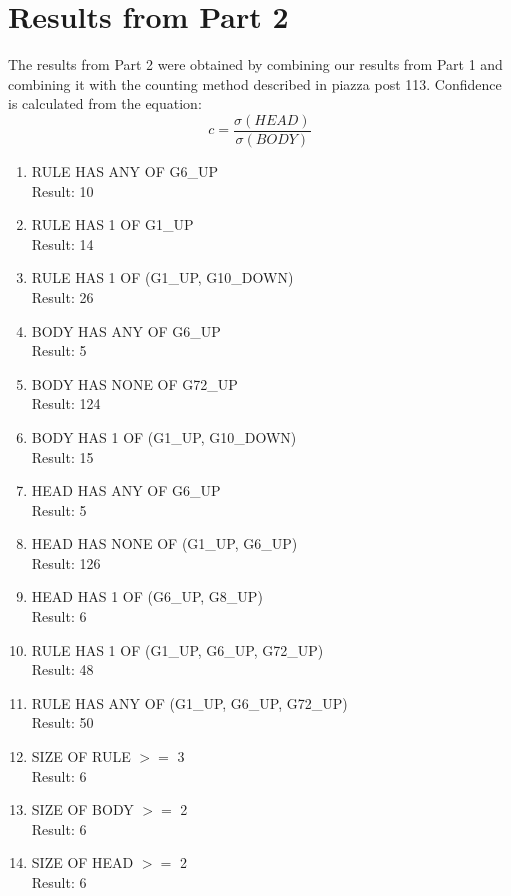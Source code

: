 \documentclass[12pt]{article}
\begin{document}
\section*{Results from Part 2}
\noindent The results from Part 2 were obtained by combining our results from Part 1 and combining it with the counting method described in piazza post 113. Confidence is calculated from the equation: \\
$$c = \frac{\sigma(HEAD)}{\sigma(BODY)}$$
\begin{enumerate} 
	\item RULE HAS ANY OF G6\_UP \\
	Result: 10\\
	\item RULE HAS 1 OF G1\_UP \\
	Result: 14\\
	\item RULE HAS 1 OF (G1\_UP, G10\_DOWN) \\
	Result: 26\\
	\item BODY HAS ANY OF G6\_UP \\
	Result: 5\\
	\item BODY HAS NONE OF G72\_UP\\
	Result: 124\\
	\item BODY HAS 1 OF (G1\_UP, G10\_DOWN)\\
	Result: 15\\
	\item HEAD HAS ANY OF G6\_UP\\
	Result: 5\\
	\item HEAD HAS NONE OF (G1\_UP, G6\_UP)\\
	Result: 126\\
	\item HEAD HAS 1 OF (G6\_UP, G8\_UP)\\
	Result: 6\\
	\item RULE HAS 1 OF (G1\_UP, G6\_UP, G72\_UP)\\
	Result: 48\\
	\item RULE HAS ANY OF (G1\_UP, G6\_UP, G72\_UP)\\
	Result: 50\\

	\item SIZE OF RULE $>=$ 3 \\
	Result: 6\\
	\item SIZE OF BODY $>=$ 2 \\
	Result: 6\\
	\item SIZE OF HEAD $>=$ 2 \\
	Result: 6\\


\end{enumerate}
\end{document}
